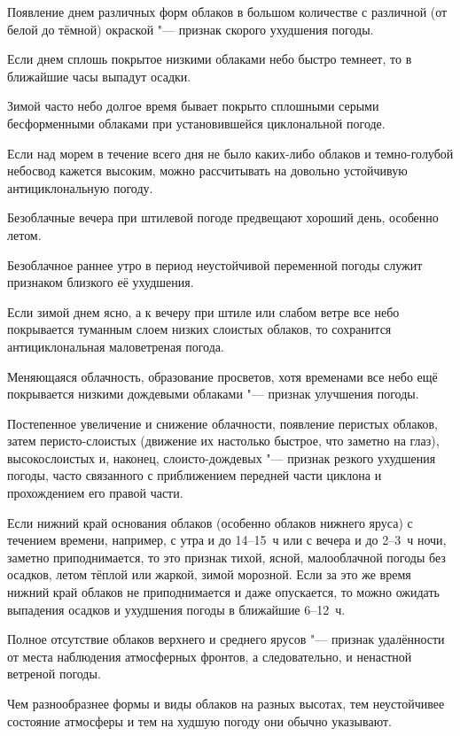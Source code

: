  Появление днем различных форм облаков в большом количестве с
различной (от белой до тёмной) окраской "--- признак скорого ухудшения
погоды.

 Если днем сплошь покрытое низкими облаками небо быстро темнеет,
то в ближайшие часы выпадут осадки.

 Зимой часто небо долгое время бывает покрыто сплошными серыми
бесформенными облаками при установившейся циклональной погоде.

 Если над морем в течение всего дня не было каких-либо облаков и
темно-голубой небосвод кажется высоким, можно рассчитывать на довольно
устойчивую антициклональную погоду.

 Безоблачные вечера при штилевой погоде предвещают хороший день,
особенно летом.

 Безоблачное раннее утро в период неустойчивой переменной погоды
служит признаком близкого её ухудшения.

 Если зимой днем ясно, а к вечеру при штиле или слабом ветре все
небо покрывается туманным слоем низких слоистых облаков, то сохранится
антициклональная маловетреная погода.

 Меняющаяся облачность, образование просветов, хотя временами
все небо ещё покрывается низкими дождевыми облаками "--- признак
улучшения погоды.

 Постепенное увеличение и снижение облачности, появление
перистых облаков, затем перисто-слоистых (движение их настолько
быстрое, что заметно на глаз), высокослоистых и, наконец,
слоисто-дождевых "--- признак резкого ухудшения погоды, часто
связанного с приближением передней части циклона и прохождением его
правой части.

 Если нижний край основания облаков (особенно облаков нижнего
яруса) с течением времени, например, с утра и до 14--15~ч или с вечера
и до 2--3~ч ночи, заметно приподнимается, то это признак тихой, ясной,
малооблачной погоды без осадков, летом тёплой или жаркой, зимой
морозной. Если за это же время нижний край облаков не приподнимается и
даже опускается, то можно ожидать выпадения осадков и ухудшения погоды
в ближайшие 6--12~ч.

 Полное отсутствие облаков верхнего и среднего ярусов "--- признак
удалённости от места наблюдения атмосферных фронтов, а следовательно,
и ненастной ветреной погоды.

 Чем разнообразнее формы и виды облаков на разных высотах, тем
неустойчивее состояние атмосферы и тем на худшую погоду они обычно
указывают.

